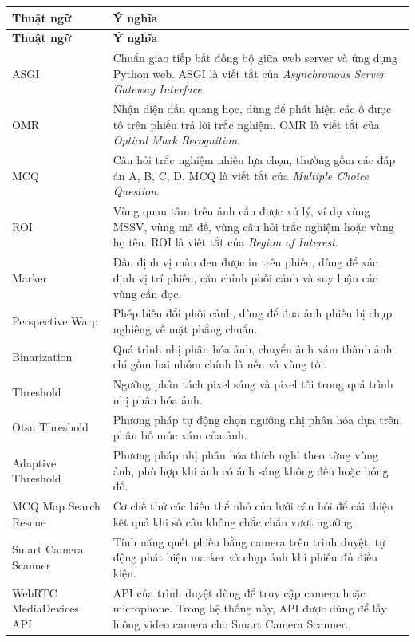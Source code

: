 \renewcommand{\arraystretch}{1.25}
\begin{longtable}{|L{3.2cm}|L{11.2cm}|}
\hline
\textbf{Thuật ngữ} & \textbf{Ý nghĩa} \\
\hline
\endfirsthead

\hline
\textbf{Thuật ngữ} & \textbf{Ý nghĩa} \\
\hline
\endhead
ASGI & Chuẩn giao tiếp bất đồng bộ giữa web server và ứng dụng Python web. ASGI là viết tắt của \textit{Asynchronous Server Gateway Interface}. \\
\hline

OMR & Nhận diện dấu quang học, dùng để phát hiện các ô được tô trên phiếu trả lời trắc nghiệm. OMR là viết tắt của \textit{Optical Mark Recognition}. \\
\hline

MCQ & Câu hỏi trắc nghiệm nhiều lựa chọn, thường gồm các đáp án A, B, C, D. MCQ là viết tắt của \textit{Multiple Choice Question}. \\
\hline

ROI & Vùng quan tâm trên ảnh cần được xử lý, ví dụ vùng MSSV, vùng mã đề, vùng câu hỏi trắc nghiệm hoặc vùng họ tên. ROI là viết tắt của \textit{Region of Interest}. \\
\hline

Marker & Dấu định vị màu đen được in trên phiếu, dùng để xác định vị trí phiếu, căn chỉnh phối cảnh và suy luận các vùng cần đọc. \\
\hline

Perspective Warp & Phép biến đổi phối cảnh, dùng để đưa ảnh phiếu bị chụp nghiêng về mặt phẳng chuẩn. \\
\hline

Binarization & Quá trình nhị phân hóa ảnh, chuyển ảnh xám thành ảnh chỉ gồm hai nhóm chính là nền và vùng tối. \\
\hline

Threshold & Ngưỡng phân tách pixel sáng và pixel tối trong quá trình nhị phân hóa ảnh. \\
\hline

Otsu Threshold & Phương pháp tự động chọn ngưỡng nhị phân hóa dựa trên phân bố mức xám của ảnh. \\
\hline

Adaptive Threshold & Phương pháp nhị phân hóa thích nghi theo từng vùng ảnh, phù hợp khi ảnh có ánh sáng không đều hoặc bóng đổ. \\
\hline

MCQ Map Search Rescue & Cơ chế thử các biến thể nhỏ của lưới câu hỏi để cải thiện kết quả khi số câu không chắc chắn vượt ngưỡng. \\
\hline

Smart Camera Scanner & Tính năng quét phiếu bằng camera trên trình duyệt, tự động phát hiện marker và chụp ảnh khi phiếu đủ điều kiện. \\
\hline

WebRTC MediaDevices API & API của trình duyệt dùng để truy cập camera hoặc microphone. Trong hệ thống này, API được dùng để lấy luồng video camera cho Smart Camera Scanner. \\
\hline

\end{longtable}
\normalsize
\newpage

